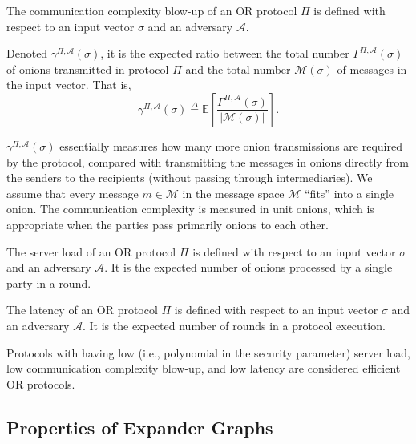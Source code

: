 \begin{definition}  \label{def:ccb}
    The communication complexity blow-up of an OR protocol $\Pi$ is defined with respect to an input vector $\sigma$ and an adversary $\mathcal{A}$. 
    
    Denoted $\gamma^{\Pi, \mathcal{A}}(\sigma)$, it is the expected ratio between the total number $\Gamma^{\Pi, \mathcal{A}}(\sigma)$ of onions transmitted in protocol $\Pi$ and the total number $\mathcal{M}(\sigma)$ of messages in the input vector. That is,
    $$
    \gamma^{\Pi, \mathcal{A}}(\sigma) \overset{\Delta}{=} \mathbb{E} \left[ \frac{\Gamma^{\Pi, \mathcal{A}}(\sigma)}{|\mathcal{M}(\sigma)|} \right].
    $$

    $\gamma^{\Pi, \mathcal{A}}(\sigma)$ essentially measures how many more onion transmissions are required by the protocol, compared with transmitting the messages in onions directly from the senders to the recipients (without passing through intermediaries). We assume that every message $m \in \mathcal{M}$ in the message space $\mathcal{M}$ “fits” into a single onion. The communication complexity is measured in unit onions, which is appropriate when the parties pass primarily onions to each other.\\
\end{definition}

\begin{definition}  \label{def:serverload}
    The server load of an OR protocol $\Pi$ is defined with respect to an input vector $\sigma$ and an adversary $\mathcal{A}$. It is the expected number of onions processed by a single party in a round.\\
\end{definition}

\begin{definition} [Latency] \label{def:latency}
    The latency of an OR protocol $\Pi$ is defined with respect to an input vector $\sigma$ and an adversary $\mathcal{A}$. It is the expected number of rounds in a protocol execution.
    
    Protocols with having low (i.e., polynomial in the security parameter) server load, low communication complexity blow-up, and low latency are considered efficient OR protocols.\\
\end{definition}

\newpage

\subsection{Properties of Expander Graphs}

